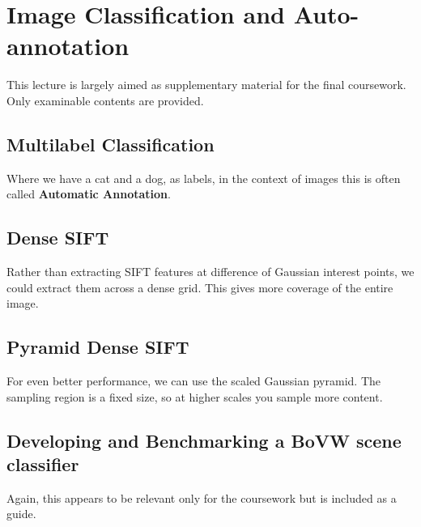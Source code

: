 \section{Image Classification and Auto-annotation}

This lecture is largely aimed as supplementary material for the final coursework. Only examinable contents are provided.

\subsection{Multilabel Classification}

Where we have a cat and a dog, as labels, in the context of images this is often called \textbf{Automatic Annotation}.

\subsection{Dense SIFT}
Rather than extracting SIFT features at difference of Gaussian interest points, we could extract them across a dense grid. This gives more coverage of the entire image.

\subsection{Pyramid Dense SIFT}
For even better performance, we can use the scaled Gaussian pyramid. The sampling region is a fixed size, so at higher scales you sample more content.

\subsection{Developing and Benchmarking a BoVW scene classifier}

Again, this appears to be relevant only for the coursework but is included as a guide.


